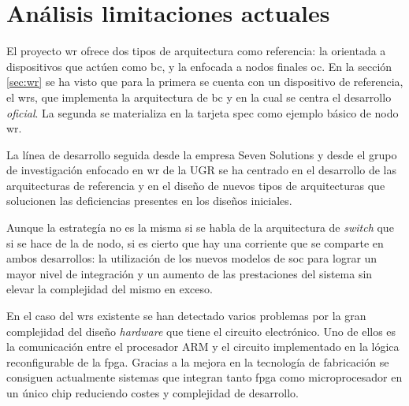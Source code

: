\chapter{Análisis limitaciones actuales}


El proyecto \gls{wr} ofrece dos tipos de arquitectura como referencia: la 
orientada a dispositivos que actúen como \gls{bc}, y la enfocada a nodos 
finales \gls{oc}. En la sección \ref{sec:wr}  
se ha visto que para la primera se cuenta 
con un dispositivo de referencia, el \gls{wrs}, que implementa la arquitectura 
de \gls{bc} y en la cual se centra el desarrollo \textit{oficial}. La segunda 
se materializa en la tarjeta \gls{spec} como ejemplo básico de nodo \gls{wr}.

La línea de desarrollo seguida desde la empresa Seven Solutions y desde el 
grupo de investigación enfocado en \gls{wr} de la UGR se ha centrado en el 
desarrollo de las arquitecturas de referencia y en el diseño de nuevos tipos de 
arquitecturas que solucionen las deficiencias presentes en los diseños 
iniciales.


Aunque la estrategía no es la misma si se habla de la arquitectura de 
\textit{switch} que si se hace de la de nodo, si es cierto que hay una 
corriente que se comparte en ambos desarrollos: la utilización de los nuevos 
modelos de \gls{soc} para lograr un mayor nivel de integración y un aumento de 
las prestaciones del sistema sin elevar la complejidad del mismo en exceso.

En el caso del \gls{wrs} existente se han detectado varios problemas por la 
gran complejidad del diseño \textit{hardware} que tiene el circuito 
electrónico. 
Uno de ellos es la comunicación entre el procesador ARM y el circuito  
implementado en la lógica reconfigurable de la \gls{fpga}. Gracias a la mejora 
en la 
tecnología de fabricación se consiguen actualmente sistemas que integran tanto 
\gls{fpga} como microprocesador en un único chip reduciendo costes y 
complejidad de desarrollo.

